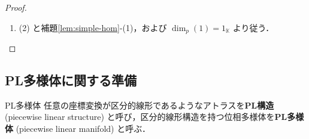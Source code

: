 \documentclass[TQFT_main]{subfiles}
\begin{document}
\begin{proof}
\begin{enumerate}
\begin{align}
\begin{tikzpicture}[baseline={([yshift=-.5ex]current bounding box.center)}]
                \draw[-<-=.5] (xn) -- ++(0,1.5) node[above] {$x_n^*$};
                \LCOEV{px1}{x1}
                \LCOEV{px2}{x2}
                \LCOEV{pxn}{xn}
                \LCOEV{ia}{a}
                \LEV{a}{pa}
                \draw[spath/save=inj] ($(ix1) + (-0.2,-0.6)$) to[out=60,in=120] ++(2.4,0) -- ++(0,0.8) -- ++(-2.4,0) -- ++(0,-0.8);
                \draw[spath/save=proj] ($(px1) + (-0.2,-0.2)$) -- ++(2.4,0) to[out=120,in=60] ++(-2.4,0);
                \fill[red, spath/use=proj];
                \fill[red, spath/use=inj];
            \end{tikzpicture} &&\because \text{補題\ref{lem:spherical-partition}-(4)} \\
            &= \begin{tikzpicture}[baseline={([yshift=-.5ex]current bounding box.center)}]
                \path coordinate[label=above:$x_1$] (l1)
                ++(0.5,0) coordinate[label=above:$x_2$] (l2)
                ++(0.8,0) coordinate[label=above:$x_n$] (l3)
                ++(1,0) coordinate[label=above:$x_n^*$] (r3)
                ++(0.8,0) coordinate[label=above:$x_2^*$] (r2)
                ++(0.5,0) coordinate[label=above:$x_1^*$] (r1);
                \node at ($(l3) + (0.5,-1)$) {$\vdots$};
                \LCOEV{l1}{r1}
                \LCOEV{l2}{r2}
                \LCOEV{l3}{r3}
            \end{tikzpicture} &&\because \text{補題\ref{lem:spherical-partition}-(2)}
        \end{align}
        
        \item (2) と補題\ref{lem:simple-hom}-(1)，および $\dim_p(1) = 1_{\mathbb{K}}$ より従う．
    \end{enumerate}
    
\end{proof}

\subsection{PL多様体に関する準備}

\begin{mydef}[label=def:PLmfd]{PL多様体}
    任意の座標変換が区分的線形であるようなアトラスを\textbf{PL構造} (piecewise linear structure) と呼び，区分的線形構造を持つ位相多様体を\textbf{PL多様体} (piecewise linear manifold) と呼ぶ．
\end{mydef}
\end{document}
